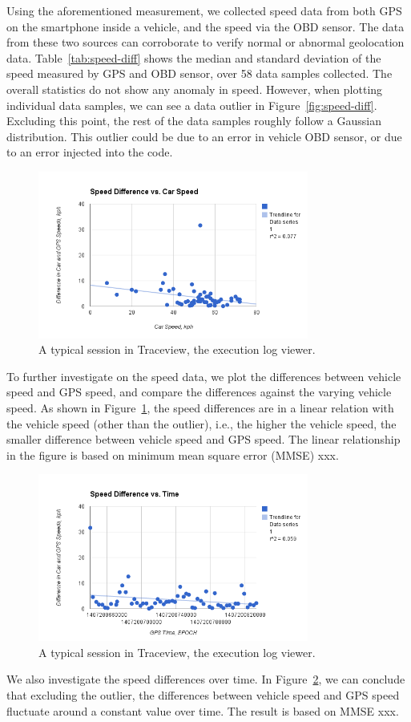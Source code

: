 Using the aforementioned measurement, we collected speed data from both GPS 
on the smartphone inside a vehicle, and the speed via the OBD sensor. 
The data from these two sources can corroborate to verify normal or abnormal 
geolocation data. Table~\ref{tab:speed-diff} shows the median and standard deviation
of the speed measured by GPS and OBD sensor, over 58 data samples collected. 
The overall statistics do not show any anomaly in speed. However, when plotting 
individual data samples, we can see a data outlier in Figure~\ref{fig:speed-diff}. 
Excluding this point, the rest of the data samples roughly follow a Gaussian 
distribution. This outlier could be due to an error in vehicle 
OBD sensor, or due to an error injected into the code. 


\begin{figure}
\centering
\includegraphics[width=3.5in]{car.png}
\caption{A typical session in Traceview, the execution log viewer.}
\label{fig:car}
\end{figure}

To further investigate on the speed data, we plot the differences between 
vehicle speed and GPS speed, and compare the differences against 
the varying vehicle speed. As shown in Figure~\ref{fig:car}, the speed 
differences are in a linear relation with the vehicle speed 
(other than the outlier), i.e., the 
higher the vehicle speed, the smaller difference between vehicle 
speed and GPS speed.  
The linear relationship in the figure is based on minimum mean 
square error (MMSE) xxx. 

\begin{figure}
\centering
\includegraphics[width=3.5in]{time.png}
\caption{A typical session in Traceview, the execution log viewer.}
\label{fig:time}
\end{figure}

We also investigate the speed differences over time. 
In Figure~\ref{fig:time}, we can conclude that excluding the outlier, 
the differences between 
vehicle speed and GPS speed fluctuate around a constant value over 
time. The result is based on MMSE xxx. 
